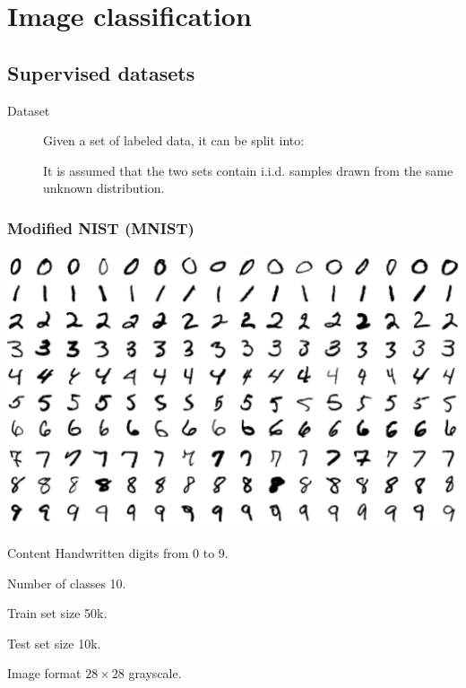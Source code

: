 \chapter{Image classification}


\section{Supervised datasets}

\begin{description}
    \item[Dataset] 
        Given a set of labeled data, it can be split into:

        It is assumed that the two sets contain i.i.d. samples drawn from the same unknown distribution.
\end{description}


\subsection{Modified NIST (MNIST)}

\begin{minipage}{0.45\linewidth}
    \centering
    \includegraphics[width=0.9\linewidth]{./img/mnist.png}
\end{minipage}
\begin{minipage}{0.5\linewidth}
    \begin{descriptionlist}
        \item[Content] Handwritten digits from 0 to 9.
        \item[Number of classes] 10.
        \item[Train set size] 50k.
        \item[Test set size] 10k.
        \item[Image format] $28 \times 28$ grayscale.
    \end{descriptionlist}
\end{minipage}



